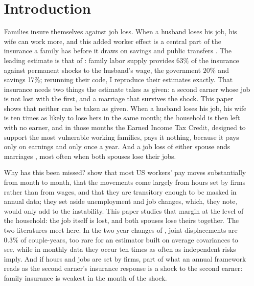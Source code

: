 \section{Introduction}\label{sec:introduction}

Families insure themselves against job loss. When a husband loses his job, his wife can work more, and this added
worker effect is a central part of the insurance a family has before it draws on savings and public transfers
\citep{lundberg1985added,cullen2000does,stephens2002worker,shore2010better,halla2020job,birinci2019spousal,mankart2017household,bacher2025joint}.
The leading estimate is that of \citet{blundell2016consumption}: family labor supply provides 63\% of the insurance
against permanent shocks to the husband's wage, the government 20\% and savings 17\%; rerunning their code, I
reproduce their estimates exactly. That insurance needs two things the estimate takes as given: a second earner whose
job is not lost with the first, and a marriage that survives the shock. This paper shows that neither can be taken as
given. When a husband loses his job, his wife is ten times as likely to lose hers in the same month; the household is
then left with no earner, and in those months the Earned Income Tax Credit, designed to support the most vulnerable
working families, pays it nothing, because it pays only on earnings and only once a year. And a job loss of either spouse ends marriages
\citep{charles2004job}, most often when both spouses lose their jobs.

Why has this been missed? \citet{ganong2026earnings} show that most US workers' pay moves substantially from month to
month, that the movements come largely from hours set by firms rather than from wages, and that they are transitory
enough to be masked in annual data; they set aside unemployment and job changes, which, they note, would only add to
the instability. This paper studies that margin at the level of the household: the job itself is lost, and both
spouses lose theirs together. The two literatures meet here. In the two-year changes of
\citet{blundell2016consumption}, joint displacements are 0.3\% of couple-years, too rare for an estimator built on
average covariances to see, while in monthly data they occur ten times as often as independent risks imply. And if
hours and jobs are set by firms, part of what an annual framework reads as the second earner's insurance response is a
shock to the second earner: family insurance is weakest in the month of the shock.

